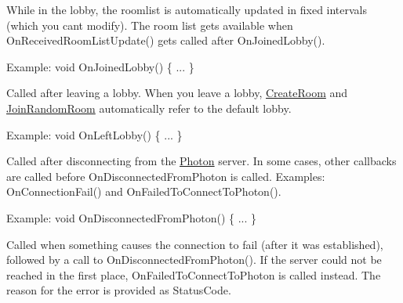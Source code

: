 \begin{Desc}
\begin{description}
While in the lobby, the roomlist is automatically updated in fixed intervals (which you can\textquotesingle{}t modify). The room list gets available when On\+Received\+Room\+List\+Update() gets called after On\+Joined\+Lobby().

Example\+: void On\+Joined\+Lobby() \{ ... \} \item[{\em 
On\+Left\+Lobby\hypertarget{group__public_api_ggaf30bbea51cc8c4b1ddc239d1c5c1468fa62d34f824fc4c61b693dd35ff3e7e79b}{}\label{group__public_api_ggaf30bbea51cc8c4b1ddc239d1c5c1468fa62d34f824fc4c61b693dd35ff3e7e79b}
}]Called after leaving a lobby. When you leave a lobby, \hyperlink{class_photon_network_a5ab80136622c2ae46b0e4f766e489d74}{Create\+Room} and \hyperlink{class_photon_network_aa9a112ccaaf71a296b823e9637584445}{Join\+Random\+Room} automatically refer to the default lobby.

Example\+: void On\+Left\+Lobby() \{ ... \} \item[{\em 
On\+Disconnected\+From\+Photon\hypertarget{group__public_api_ggaf30bbea51cc8c4b1ddc239d1c5c1468fa6fae9412143c8e2158841c492b22d698}{}\label{group__public_api_ggaf30bbea51cc8c4b1ddc239d1c5c1468fa6fae9412143c8e2158841c492b22d698}
}]Called after disconnecting from the \hyperlink{namespace_photon}{Photon} server. In some cases, other callbacks are called before On\+Disconnected\+From\+Photon is called. Examples\+: On\+Connection\+Fail() and On\+Failed\+To\+Connect\+To\+Photon().

Example\+: void On\+Disconnected\+From\+Photon() \{ ... \} \item[{\em 
On\+Connection\+Fail\hypertarget{group__public_api_ggaf30bbea51cc8c4b1ddc239d1c5c1468fa90c9be8eb52ae376a236bfd0a28d7918}{}\label{group__public_api_ggaf30bbea51cc8c4b1ddc239d1c5c1468fa90c9be8eb52ae376a236bfd0a28d7918}
}]Called when something causes the connection to fail (after it was established), followed by a call to On\+Disconnected\+From\+Photon(). If the server could not be reached in the first place, On\+Failed\+To\+Connect\+To\+Photon is called instead. The reason for the error is provided as Status\+Code.


\end{description}
\end{Desc}
